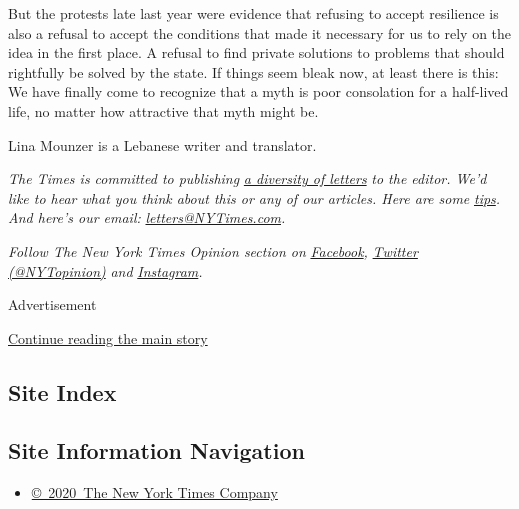 But the protests late last year were evidence that refusing to accept
resilience is also a refusal to accept the conditions that made it
necessary for us to rely on the idea in the first place. A refusal to
find private solutions to problems that should rightfully be solved by
the state. If things seem bleak now, at least there is this: We have
finally come to recognize that a myth is poor consolation for a
half-lived life, no matter how attractive that myth might be.

Lina Mounzer is a Lebanese writer and translator.

\emph{The Times is committed to publishing}
\href{https://www.nytimes3xbfgragh.onion/2019/01/31/opinion/letters/letters-to-editor-new-york-times-women.html}{\emph{a
diversity of letters}} \emph{to the editor. We'd like to hear what you
think about this or any of our articles. Here are some}
\href{https://help.nytimes3xbfgragh.onion/hc/en-us/articles/115014925288-How-to-submit-a-letter-to-the-editor}{\emph{tips}}\emph{.
And here's our email:}
\href{mailto:letters@NYTimes.com}{\emph{letters@NYTimes.com}}\emph{.}

\emph{Follow The New York Times Opinion section on}
\href{https://www.facebookcorewwwi.onion/nytopinion}{\emph{Facebook}}\emph{,}
\href{http://twitter.com/NYTOpinion}{\emph{Twitter (@NYTopinion)}}
\emph{and}
\href{https://www.instagram.com/nytopinion/}{\emph{Instagram}}\emph{.}

Advertisement

\protect\hyperlink{after-bottom}{Continue reading the main story}

\hypertarget{site-index}{%
\subsection{Site Index}\label{site-index}}

\hypertarget{site-information-navigation}{%
\subsection{Site Information
Navigation}\label{site-information-navigation}}

\begin{itemize}
\tightlist
\item
  \href{https://help.nytimes3xbfgragh.onion/hc/en-us/articles/115014792127-Copyright-notice}{©~2020~The
  New York Times Company}
\end{itemize}

